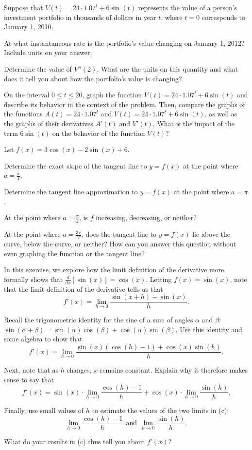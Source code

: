 \begin{exercises} 
\item Suppose that $V(t) = 24 \cdot 1.07^t + 6 \sin(t)$ represents the value of a person's investment portfolio in thousands of dollars in year $t$, where $t = 0$ corresponds to January 1, 2010.
\ba
	\item At what instantaneous rate is the portfolio's value changing on January 1, 2012?  Include units on your answer.
	\item Determine the value of $V''(2)$.  What are the units on this quantity and what does it tell you about how the portfolio's value is changing?
	\item On the interval $0 \le t \le 20$, graph the function $V(t) = 24 \cdot 1.07^t + 6 \sin(t)$ and describe its behavior in the context of the problem.  Then, compare the graphs of the functions $A(t) = 24 \cdot 1.07^t$ and $V(t) = 24 \cdot 1.07^t + 6 \sin(t)$, as well as the graphs of their derivatives $A'(t)$ and $V'(t)$.  What is the impact of the term $6 \sin(t)$ on the behavior of the function $V(t)$?
\ea
\item Let $f(x) = 3\cos(x) - 2\sin(x) + 6$.
	\ba
		\item Determine the exact slope of the tangent line to $y = f(x)$ at the point where $a = \frac{\pi}{4}$.
		\item Determine the tangent line approximation to $y = f(x)$ at the point where $a = \pi$.
		\item At the point where $a = \frac{\pi}{2}$, is $f$ increasing, decreasing, or neither?
		\item At the point where $a = \frac{3\pi}{2}$, does the tangent line to $y = f(x)$ lie above the curve, below the curve, or neither?  How can  you answer this question without even graphing the function or the tangent line?
	\ea
\item In this exercise, we explore how the limit definition of the derivative more formally shows that $\frac{d}{dx}[\sin(x)] = \cos(x)$.   Letting $f(x) = \sin(x)$, note that the limit definition of the derivative tells us that
	$$f'(x) = \lim_{h \to 0} \frac{\sin(x+h) - \sin(x)}{h}.$$
\ba
	\item Recall the trigonometric identity for the sine of a sum of angles $\alpha$ and $\beta$: \\ $\sin(\alpha + \beta) = \sin(\alpha)\cos(\beta) + \cos(\alpha)\sin(\beta)$.  Use this identity and some algebra to show that
	$$f'(x) = \lim_{h \to 0} \frac{\sin(x)(\cos(h)-1) + \cos(x)\sin(h)}{h}.$$
	\item Next, note that as $h$ changes, $x$ remains constant. Explain why it therefore makes sense to say that
	$$f'(x) = \sin(x) \cdot \lim_{h \to 0} \frac{\cos(h) -1 }{h} + \cos(x) \cdot \lim_{h \to 0} \frac{\sin(h)}{h}.$$
	\item Finally, use small values of $h$ to estimate the values of the two limits in (c):
	$$\lim_{h \to 0} \frac{\cos(h) - 1}{h} \ \ \mbox{and} \ \ \lim_{h \to 0} \frac{\sin(h)}{h}.$$
	\item What do your results in (c) thus tell you about $f'(x)$?
\ea 
\end{exercises}
\afterexercises
